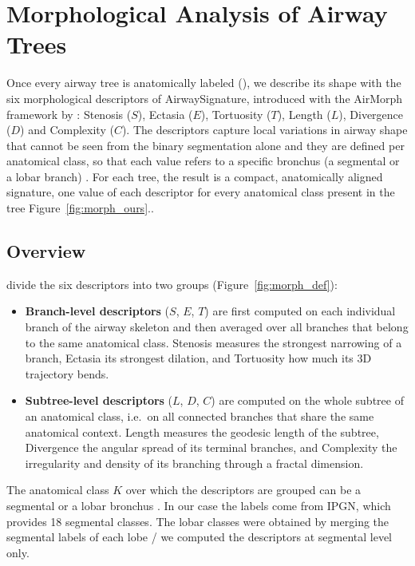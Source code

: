 \section[Morphological Metrics]{Morphological Analysis of Airway Trees}
\label{sec:morphometrics}                %
\label{sec:morph}                        %

Once every airway tree is anatomically labeled (), we describe its shape
with the six morphological descriptors of AirwaySignature, introduced with the AirMorph
framework by \citet{zhang2025airmorph}: Stenosis ($S$), Ectasia ($E$), Tortuosity ($T$),
Length ($L$), Divergence ($D$) and Complexity ($C$). The descriptors capture local variations
in airway shape that cannot be seen from the binary segmentation alone and they are defined
per anatomical class, so that each value refers to a specific bronchus (a segmental or a
lobar branch) \cite{zhang2025airmorph}. For each tree, the result is a compact, anatomically
aligned signature, one value of each descriptor for every anatomical class present in the
tree Figure~\ref{fig:morph_ours}..

\subsection{Overview}                    %
\label{sec:morph_overview}               %

\citet{zhang2025airmorph} divide the six descriptors into two groups
(Figure~\ref{fig:morph_def}):
\begin{itemize}                          %
  \item \textbf{Branch-level descriptors} ($S$, $E$, $T$) are first computed on each
        individual branch of the airway skeleton and then averaged over all branches that
        belong to the same anatomical class. Stenosis measures the strongest narrowing
        of a branch, Ectasia its strongest dilation, and Tortuosity how much its 3D
        trajectory bends.
  \item \textbf{Subtree-level descriptors} ($L$, $D$, $C$) are computed on the whole
        subtree of an anatomical class, i.e.\ on all connected branches that share the same
        anatomical context. Length measures the geodesic length of the subtree,
        Divergence the angular spread of its terminal branches, and Complexity the
        irregularity and density of its branching through a fractal dimension.
\end{itemize}
The anatomical class $K$ over which the descriptors are grouped can be a segmental or a
lobar bronchus \cite{zhang2025airmorph}. In our case the labels come from IPGN, which
provides 18 segmental classes. The lobar classes were obtained by merging the segmental
labels of each lobe / we computed the descriptors at segmental level only.

